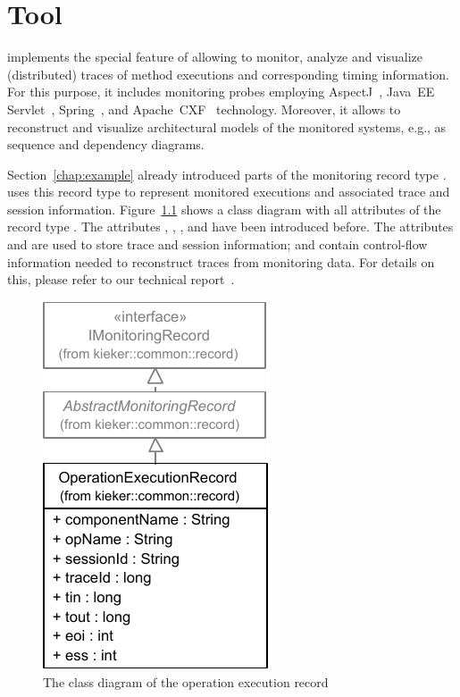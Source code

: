 %

\chapter{\KiekerTraceAnalysis{} Tool}\label{chap:aspectJ}

\KiekerTraceAnalysis{} implements the special feature of \Kieker{} allowing to %
monitor, analyze and visualize (distributed) traces of method executions and %
corresponding timing information. For this purpose, it includes monitoring probes employing %
AspectJ~\cite{AspectJ-WebSite}, Java~EE Servlet~\cite{JavaServletTechnology-WebSite}, %
Spring~\cite{Spring-WebSite}, and Apache~CXF~\cite{CXF-WebSite} technology. %
Moreover, it allows to reconstruct and visualize architectural models of the %
monitored systems, e.g., as sequence and dependency diagrams. %

Section~\ref{chap:example} already introduced parts of the monitoring record %
type . \KiekerTraceAnalysis{} uses this record %
type to represent monitored executions and associated trace and session information. %
Figure~\ref{fig:OperationExecutionRecordClassDiagramComplete} shows a class diagram %
with all attributes of the record type . %
The attributes , , %
, and  have been introduced before. %
The attributes  and  are used to store %
trace and session information;  and  contain control-flow %
information needed to reconstruct traces from monitoring data. %
For details on this, please refer to our technical %
report~\cite{vanHoornRohrHasselbringWallerEhlersFreyKieselhorst2009TRContinuousMonitoringOfSoftwareServicesDesignAndApplicationOfTheKiekerFramework}.

\begin{figure}[hb]\centering
\includegraphics[scale=0.8]{images/kieker_OperationExecutionRecord-complete-modified}%
\caption{The class diagram of the operation execution record}
\label{fig:OperationExecutionRecordClassDiagramComplete}
\end{figure}

